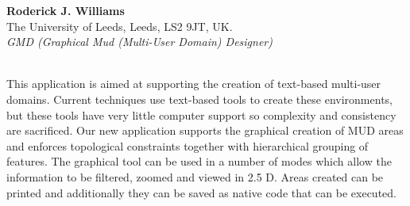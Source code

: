 \begin{center}
\end{center}
\begin{tabular}
{\bf Roderick J. Williams}\\
The University of Leeds, Leeds, LS2 9JT, UK.\\
{\it GMD (Graphical Mud (Multi-User Domain) Designer)}\\
\\
\end{tabular}
This application is aimed at supporting the creation of text-based multi-user
domains. Current techniques use text-based tools to create these environments,
but these tools have very little computer support so complexity and consistency
are sacrificed.
Our new application supports the graphical creation of MUD areas and enforces
topological constraints together with hierarchical grouping of features.
The graphical tool can be used in a number of modes which allow the information
to be filtered, zoomed and viewed in 2.5 D. Areas created can be printed and
additionally they can be saved as native code that can be executed.

\newpage{}



